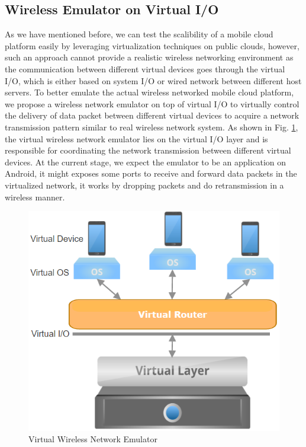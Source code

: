 \documentclass[journal,comsoc]{IEEEtran}
\begin{document}
\subsection{Wireless Emulator on Virtual I/O}
As we have mentioned before, we can test the scalibility of a mobile cloud platform easily by leveraging virtualization techniques on public clouds, however, such an approach cannot provide a realistic wireless networking environment as the communication between different virtual devices goes through the virtual I/O, which is either based on system I/O or wired network between different host servers. To better emulate the actual wireless networked mobile cloud platform, we propose a wireless network emulator on top of virtual I/O to virtually control the delivery of data packet between different virtual devices to acquire a network transmission pattern similar to real wireless network system. As shown in Fig. \ref{virtual_router}, the virtual wireless network emulator lies on the virtual I/O layer and is responsible for coordinating the network transmission between different virtual devices. At the current stage, we expect the emulator to be an application on Android, it might exposes some ports to receive and forward data packets in the virtualized network, it works by dropping packets and do retransmission in a wireless manner. 
\begin{figure}[htbp]
\begin{center}
\includegraphics[width=0.8\linewidth]{virtual_router.png} 
\end{center}	   
\caption{Virtual Wireless Network Emulator}\label{virtual_router}
\end{figure}
\end{document}
